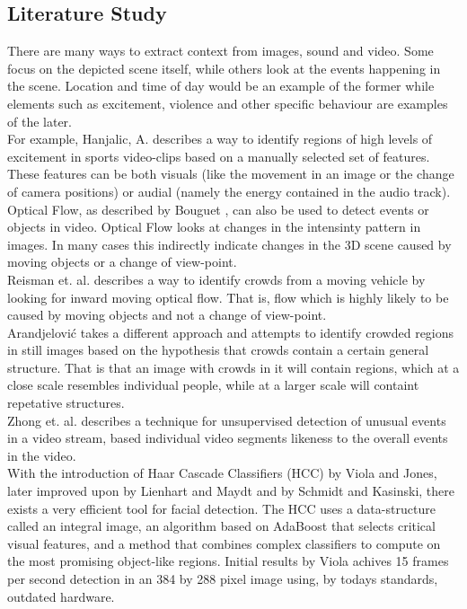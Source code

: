 \subsection{Literature Study}
%
%
There are many ways to extract context from images, sound and video. Some focus on the depicted scene itself, while others look at the events happening in the scene. Location and time of day would be an example of the former while elements such as excitement, violence and other specific behaviour are examples of the later.\\
For example, Hanjalic, A. \cite{citeulike:405480} describes a way to identify regions of high levels of excitement in sports video-clips based on a manually selected set of features. These features can be both visuals (like the movement in an image or the change of camera positions) or audial (namely the energy contained in the audio track).\\
Optical Flow, as described by Bouguet \cite{Bouguet2000}, can also be used to detect events or objects in video. Optical Flow looks at changes in the intensinty pattern in images. In many cases this indirectly indicate changes in the 3D scene caused by moving objects or a change of view-point.\\
Reisman et. al. \cite{CrowdDetectionInVideoSequences} describes a way to identify crowds from a moving vehicle by looking for inward moving optical flow. That is, flow which is highly likely to be caused by moving objects and not a change of view-point.\\
Arandjelović \cite{Arandjelovic08crowddetection} takes a different approach and attempts to identify crowded regions in still images based on the hypothesis that crowds contain a certain general structure. That is that an image with crowds in it will contain regions, which at a close scale resembles individual people, while at a larger scale will containt repetative structures.\\
Zhong et. al. \cite{10.1109/CVPR.2004.78} describes a technique for unsupervised detection of unusual events in a video stream, based individual video segments likeness to the overall events in the video.
\\
%
With the introduction of Haar Cascade Classifiers (HCC) by Viola and Jones\cite{viola01}, later improved upon by Lienhart and Maydt\cite{lienhart01} and by Schmidt and Kasinski\cite{schmidt01}\cite{schmidt02}, there exists a very efficient tool for facial detection. The HCC uses a data-structure called an integral image, an algorithm based on AdaBoost that selects critical visual features, and a method that combines complex classifiers to compute on the most promising object-like regions. Initial results by Viola achives 15 frames per second detection in an 384 by 288 pixel image using, by todays standards, outdated hardware.
